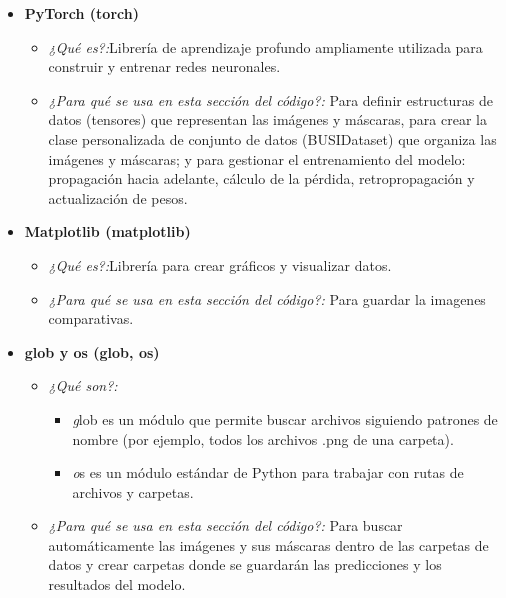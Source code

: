 \documentclass[12pt]{article}
\begin{document}
\begin{itemize}
     \item \textbf{ PyTorch (torch)}
         \begin{itemize}
        \item \textit{¿Qué es?:}Librería de aprendizaje profundo ampliamente utilizada para construir y entrenar redes neuronales.
    \end{itemize}
    \begin{itemize}
        \item \textit{¿Para qué se usa en esta sección del código?:} Para definir estructuras de datos (tensores) que representan las imágenes y máscaras, para crear la clase personalizada de conjunto de datos (BUSIDataset) que organiza las imágenes y máscaras; y para gestionar el entrenamiento del modelo: propagación hacia adelante, cálculo de la pérdida, retropropagación y actualización de pesos.
    \end{itemize}
    \item \textbf{ Matplotlib (matplotlib)}
         \begin{itemize}
        \item \textit{¿Qué es?:}Librería para crear gráficos y visualizar datos.
    \end{itemize}
    \begin{itemize}
        \item \textit{¿Para qué se usa en esta sección del código?:} Para guardar la imagenes comparativas.
    \end{itemize}
     \item \textbf{ glob y os (glob, os)}
         \begin{itemize}
        \item \textit{¿Qué son?:}
            \begin{itemize}
                \item \textit glob es un módulo que permite buscar archivos siguiendo patrones de nombre (por ejemplo, todos los archivos .png de una carpeta).
                \item \textit os es un módulo estándar de Python para trabajar con rutas de archivos y carpetas.
             \end{itemize}
    \end{itemize}
    \begin{itemize}
        \item \textit{¿Para qué se usa en esta sección del código?:} Para buscar automáticamente las imágenes y sus máscaras dentro de las carpetas de datos y crear carpetas donde se guardarán las predicciones y los resultados del modelo.

\end{itemize}
\end{itemize}
\end{document}
